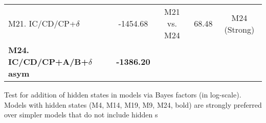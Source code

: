 \begin{supptable}
\begin{tabular}{|l|c|c|c|c|}
M21. IC/CD/CP+$\delta$                   & -1454.68                                                          & M21 vs. M24 & 68.48           & M24 (Strong)                                                         \\
\textbf{M24. IC/CD/CP+A/B+$\delta$ asym} & \textbf{-1386.20}                                                 &             &                 &                                                                      \\ \hline
\end{tabular}
\caption{Test for addition of hidden states in models via Bayes factors (in log-scale). Models with hidden states  (M4, M14, M19, M9, M24, bold) are strongly preferred over simpler models that do not include hidden s}
\label{supptable:testaddhidden}
\end{supptable}


